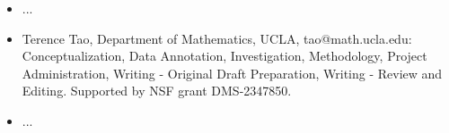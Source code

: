 \begin{itemize}
    \item ...
    \item Terence Tao, Department of Mathematics, UCLA, tao@math.ucla.edu: Conceptualization, Data Annotation, Investigation, Methodology, Project Administration, Writing - Original Draft Preparation, Writing - Review and Editing. Supported by NSF grant DMS-2347850.
    \item ...
\end{itemize}
